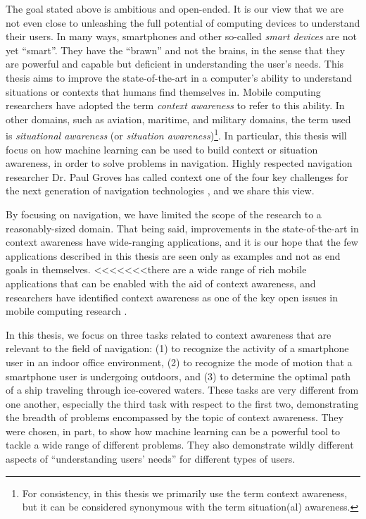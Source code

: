 The goal stated above is ambitious and open-ended. It is our view that we are not even close to unleashing the full potential of computing devices to understand their users. In many ways, smartphones and other so-called \emph{smart devices} are not yet ``smart''. They have the ``brawn'' and not the brains, in the sense that they are powerful and capable but deficient in understanding the user's needs. This thesis aims to improve the state-of-the-art in a computer's ability to understand situations or contexts that humans find themselves in. Mobile computing researchers have adopted the term \emph{context awareness} to refer to this ability. In other domains, such as aviation, maritime, and military domains, the term used is \emph{situational awareness} (or \emph{situation awareness})\footnote{For consistency, in this thesis we primarily use the term context awareness, but it can be considered synonymous with the term situation(al) awareness.}. In particular, this thesis will focus on how machine learning can be used to build context or situation awareness, in order to solve problems in navigation. Highly respected navigation researcher Dr. Paul Groves has called context one of the four key challenges for the next generation of navigation technologies \cite{Groves2014}, and we share this view.

By focusing on navigation, we have limited the scope of the research to a reasonably-sized domain. That being said, improvements in the state-of-the-art in context awareness have wide-ranging applications, and it is our hope that the few applications described in this thesis are seen only as examples and not as end goals in themselves. <<<<<<<there are a wide range of rich mobile applications that can be enabled with the aid of context awareness, and researchers have identified context awareness as one of the key open issues in mobile computing research \cite{abolfazli2014rich}.

In this thesis, we focus on three tasks related to context awareness that are relevant to the field of navigation: (1) to recognize the activity of a smartphone user in an indoor office environment, (2) to recognize the mode of motion that a smartphone user is undergoing outdoors, and (3) to determine the optimal path of a ship traveling through ice-covered waters. These tasks are very different from one another, especially the third task with respect to the first two, demonstrating the breadth of problems encompassed by the topic of context awareness. They were chosen, in part, to show how machine learning can be a powerful tool to tackle a wide range of different problems. They also demonstrate wildly different aspects of ``understanding users' needs'' for different types of users.

